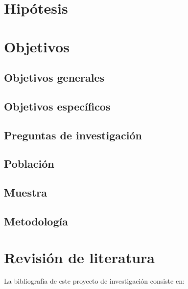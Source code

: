 \documentclass{report}
\begin{document}
\section{Hipótesis}


\section{Objetivos}


\subsection{Objetivos generales}


\subsection{Objetivos específicos}



\subsection{Preguntas de investigación}


\subsection{Población}


\subsection{Muestra}


\subsection{Metodología}


\section{Revisión de literatura}

La bibliografía de este proyecto de investigación consiste en:
\end{document}
